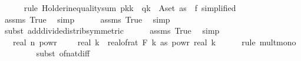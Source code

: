 \begin{isabellebody}
\ \ \ \ \isamarkupfalse%
\ {\isacharparenleft}{\kern0pt}rule\ Holder{\isacharunderscore}{\kern0pt}inequality{\isacharunderscore}{\kern0pt}sum{\isacharbrackleft}{\kern0pt}\ p{\isacharequal}{\kern0pt}{\isachardoublequoteopen}k{\isacharslash}{\kern0pt}{\isacharparenleft}{\kern0pt}k{\isacharminus}{\kern0pt}{}{\isacharparenright}{\kern0pt}{\isachardoublequoteclose}\ \ q{\isacharequal}{\kern0pt}{\isachardoublequoteopen}k{\isachardoublequoteclose}\ \ A{\isacharequal}{\kern0pt}{\isachardoublequoteopen}set\ as{\isachardoublequoteclose}\ \ f{\isacharequal}{\kern0pt}{\isachardoublequoteopen}{\isasymlambda}{\isacharunderscore}{\kern0pt}{\isachardot}{\kern0pt}{}{\isachardoublequoteclose}{\isacharcomma}{\kern0pt}\ simplified{\isacharbrackright}{\kern0pt}{\isacharparenright}{\kern0pt}\isanewline
\ \ \ \ \isamarkupfalse%
\ assms\ True\ \isamarkupfalse%
\ {\isacharparenleft}{\kern0pt}simp{\isacharparenright}{\kern0pt}\isanewline
\ \ \ \ \isamarkupfalse%
\ assms\ True\ \isamarkupfalse%
\ {\isacharparenleft}{\kern0pt}simp{\isacharparenright}{\kern0pt}\isanewline
\ \ \ \ \isamarkupfalse%
\ {\isacharparenleft}{\kern0pt}subst\ add{\isacharunderscore}{\kern0pt}divide{\isacharunderscore}{\kern0pt}distrib{\isacharbrackleft}{\kern0pt}symmetric{\isacharbrackright}{\kern0pt}{\isacharparenright}{\kern0pt}\isanewline
\ \ \ \ \isamarkupfalse%
\ assms\ True\ \isamarkupfalse%
\ simp\isanewline
\ \ \isamarkupfalse%
\ \isamarkupfalse%
\ {\isachardoublequoteopen}{\isachardot}{\kern0pt}{\isachardot}{\kern0pt}{\isachardot}{\kern0pt}\ {\isasymle}\ real\ n\ powr\ {\isacharparenleft}{\kern0pt}{}\ {\isacharminus}{\kern0pt}\ {}\ {\isacharslash}{\kern0pt}\ real\ k{\isacharparenright}{\kern0pt}\ {\isacharasterisk}{\kern0pt}\ real{\isacharunderscore}{\kern0pt}of{\isacharunderscore}{\kern0pt}rat\ {\isacharparenleft}{\kern0pt}F\ k\ as{\isacharparenright}{\kern0pt}\ powr\ {\isacharparenleft}{\kern0pt}{}{\isacharslash}{\kern0pt}real\ k{\isacharparenright}{\kern0pt}{\isachardoublequoteclose}\isanewline
\ \ \ \ \isamarkupfalse%
\ {\isacharparenleft}{\kern0pt}rule\ mult{\isacharunderscore}{\kern0pt}mono{\isacharparenright}{\kern0pt}\isanewline
\ \ \ \ \ \ \ \isamarkupfalse%
\ {\isacharparenleft}{\kern0pt}subst\ of{\isacharunderscore}{\kern0pt}nat{\isacharunderscore}{\kern0pt}diff{\isacharparenright}{\kern0pt}\ \isamarkupfalse%

\end{isabellebody}
